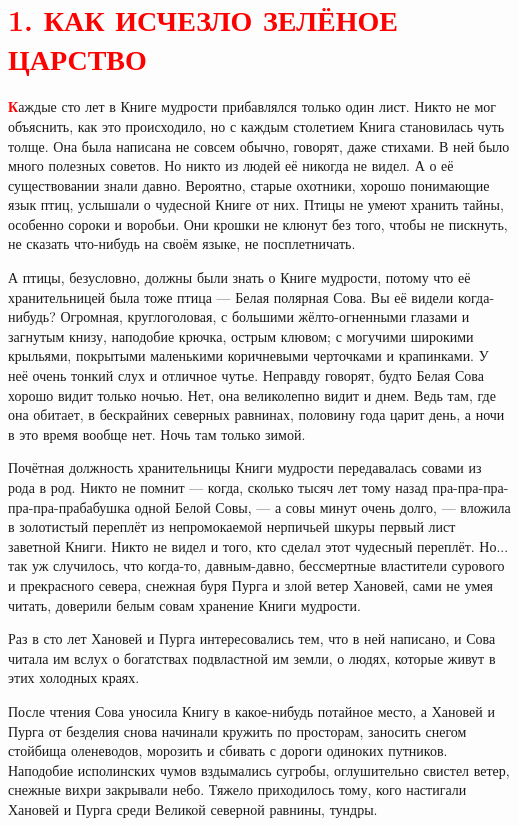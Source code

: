 \documentclass[12pt, a4paper, openany]{book}
\begin{document}
\setcounter{secnumdepth}{0}  
	
	\section[1. Как исчезло зелёное царство]{\center \textcolor{red}{1. КАК ИСЧЕЗЛО ЗЕЛЁНОЕ ЦАРСТВО}}
	
	\lettrine[findent=0pt]{\textbf{\textcolor{red}{К}}}{}аждые сто лет в Книге мудрости прибавлялся только один лист. Никто не мог объяснить, как это происходило, но с каждым столетием Книга становилась чуть толще. Она была написана не совсем обычно, говорят, даже стихами. В ней было много полезных советов. Но никто из людей её никогда не видел. А о её существовании знали давно. Вероятно, старые охотники, хорошо понимающие язык птиц, услышали о чудесной Книге от них. Птицы не умеют хранить тайны, особенно сороки и воробьи. Они крошки не клюнут без того, чтобы не пискнуть, не сказать что-нибудь на своём языке, не посплетничать.
	
	А птицы, безусловно, должны были знать о Книге мудрости, потому что её хранительницей была тоже птица — Белая полярная Сова. Вы её видели когда-нибудь? Огромная, круглоголовая, с большими жёлто-огненными глазами и загнутым книзу, наподобие крючка, острым клювом; с могучими широкими крыльями, покрытыми маленькими коричневыми черточками и крапинками. У неё очень тонкий слух и отличное чутье. Неправду говорят, будто Белая Сова хорошо видит только ночью. Нет, она великолепно видит и днем. Ведь там, где она обитает, в бескрайних северных равнинах, половину года царит день, а ночи в это время вообще нет. Ночь там только зимой.
	
	Почётная должность хранительницы Книги мудрости передавалась совами из рода в род. Никто не помнит — когда, сколько тысяч лет тому назад пра-пра-пра-пра-пра-прабабушка одной Белой Совы, — а совы минут очень долго, — вложила в золотистый переплёт из непромокаемой нерпичьей шкуры первый лист заветной Книги. Никто не видел и того, кто сделал этот чудесный переплёт. Но... так уж случилось, что когда-то, давным-давно, бессмертные властители сурового и прекрасного севера, снежная буря Пурга и злой ветер Хановей, сами не умея читать, доверили белым совам хранение Книги мудрости.
	
	Раз в сто лет Хановей и Пурга интересовались тем, что в ней написано, и Сова читала им вслух о богатствах подвластной им земли, о людях, которые живут в этих холодных краях.
	
	После чтения Сова уносила Книгу в какое-нибудь потайное место, а Хановей и Пурга от безделия снова начинали кружить по просторам, заносить снегом стойбища оленеводов, морозить и сбивать с дороги одиноких путников. Наподобие исполинских чумов вздымались сугробы, оглушительно свистел ветер, снежные вихри закрывали небо. Тяжело приходилось тому, кого настигали Хановей и Пурга среди Великой северной равнины, тундры.
	
\end{document}
